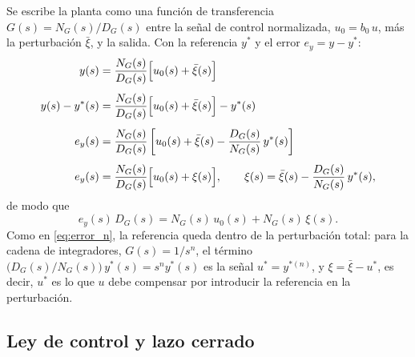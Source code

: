 Se escribe la planta como una función de transferencia
$G(s) = N_G(s)/D_G(s)$ entre la señal de control normalizada,
$u_0 = b_0\,u$, más la perturbación $\bar{\xi}$, y la salida. Con la referencia
$y^{*}$ y el error $e_y = y - y^{*}$:
\begin{align}
y(s) &= \frac{N_G(s)}{D_G(s)}\Bigl[u_0(s) + \bar{\xi}(s)\Bigr] \nonumber\\[4pt]
y(s) - y^{*}(s) &= \frac{N_G(s)}{D_G(s)}\Bigl[u_0(s) + \bar{\xi}(s)\Bigr] - y^{*}(s) \nonumber\\[4pt]
e_y(s) &= \frac{N_G(s)}{D_G(s)}\left[u_0(s) + \bar{\xi}(s) - \frac{D_G(s)}{N_G(s)}\,y^{*}(s)\right] \nonumber\\[4pt]
e_y(s) &= \frac{N_G(s)}{D_G(s)}\Bigl[u_0(s) + \xi(s)\Bigr],
\qquad \xi(s) = \bar{\xi}(s) - \frac{D_G(s)}{N_G(s)}\,y^{*}(s) ,
\end{align}
de modo que
\begin{equation}
e_y(s)\,D_G(s) = N_G(s)\,u_0(s) + N_G(s)\,\xi(s) .
\label{eq:gpi_error_frac}
\end{equation}
Como en \eqref{eq:error_n}, la referencia queda dentro de la perturbación total:
para la cadena de integradores, $G(s) = 1/s^n$, el término
$\bigl(D_G(s)/N_G(s)\bigr)\,y^{*}(s) = s^n y^{*}(s)$ es la señal $u^{*} = y^{*(n)}$, y
$\xi = \bar{\xi} - u^{*}$, es decir, $u^{*}$ es lo que $u$ debe compensar por introducir la referencia en la perturbación.

\subsection{Ley de control y lazo cerrado}
\label{subsec:gpi_lazo}

